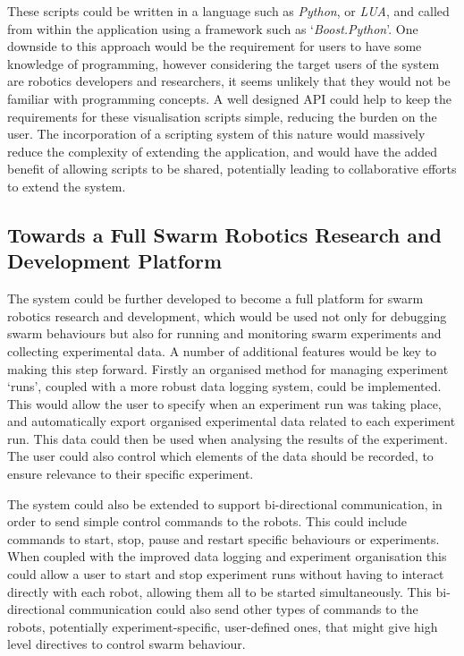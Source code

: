 These scripts could be written in a language such as \textit{Python}, or \textit{LUA}, and called from within the application using a framework such as `\textit{Boost.Python}'. One downside to this approach would be the requirement for users to have some knowledge of programming, however considering the target users of the system are robotics developers and researchers, it seems unlikely that they would not be familiar with programming concepts. A well designed API could help to keep the requirements for these visualisation scripts simple, reducing the burden on the user. The incorporation of a scripting system of this nature would massively reduce the complexity of extending the application, and would have the added benefit of allowing scripts to be shared, potentially leading to collaborative efforts to extend the system.


\subsection{Towards a Full Swarm Robotics Research and Development Platform}

The system could be further developed to become a full platform for swarm robotics research and development, which would be used not only for debugging swarm behaviours but also for running and monitoring swarm experiments and collecting experimental data. A number of additional features would be key to making this step forward. Firstly an organised method for managing experiment `runs', coupled with a more robust data logging system, could be implemented. This would allow the user to specify when an experiment run was taking place, and automatically export organised experimental data related to each experiment run. This data could then be used when analysing the results of the experiment. The user could also control which elements of the data should be recorded, to ensure relevance to their specific experiment.

The system could also be extended to support bi-directional communication, in order to send simple control commands to the robots. This could include commands to start, stop, pause and restart specific behaviours or experiments. When coupled with the improved data logging and experiment organisation this could allow a user to start and stop experiment runs without having to interact directly with each robot, allowing them all to be started simultaneously. This bi-directional communication could also send other types of commands to the robots, potentially experiment-specific, user-defined ones, that might give high level directives to control swarm behaviour.

